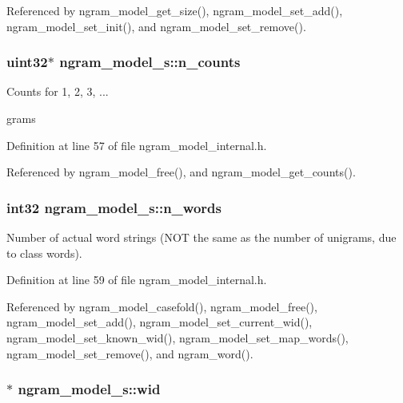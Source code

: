 Referenced by ngram\-\_\-model\-\_\-get\-\_\-size(), ngram\-\_\-model\-\_\-set\-\_\-add(), ngram\-\_\-model\-\_\-set\-\_\-init(), and ngram\-\_\-model\-\_\-set\-\_\-remove().

\subsubsection[{n\-\_\-counts}]{\setlength{\rightskip}{0pt plus 5cm}uint32$\ast$ ngram\-\_\-model\-\_\-s\-::n\-\_\-counts}\label{structngram__model__s_a710daed84ee676f79dcbf510fca238e8}


Counts for 1, 2, 3, ... 

grams 

Definition at line 57 of file ngram\-\_\-model\-\_\-internal.\-h.



Referenced by ngram\-\_\-model\-\_\-free(), and ngram\-\_\-model\-\_\-get\-\_\-counts().

\subsubsection[{n\-\_\-words}]{\setlength{\rightskip}{0pt plus 5cm}int32 ngram\-\_\-model\-\_\-s\-::n\-\_\-words}\label{structngram__model__s_a74f85927ef0d5513a1e6c02d13864be3}


Number of actual word strings (N\-O\-T the same as the number of unigrams, due to class words). 



Definition at line 59 of file ngram\-\_\-model\-\_\-internal.\-h.



Referenced by ngram\-\_\-model\-\_\-casefold(), ngram\-\_\-model\-\_\-free(), ngram\-\_\-model\-\_\-set\-\_\-add(), ngram\-\_\-model\-\_\-set\-\_\-current\-\_\-wid(), ngram\-\_\-model\-\_\-set\-\_\-known\-\_\-wid(), ngram\-\_\-model\-\_\-set\-\_\-map\-\_\-words(), ngram\-\_\-model\-\_\-set\-\_\-remove(), and ngram\-\_\-word().

\subsubsection[{wid}]{$\ast$ ngram\-\_\-model\-\_\-s\-::wid}\label{structngram__model__s_a75567419a8002ef6e916c81f5d9ee9ed}


